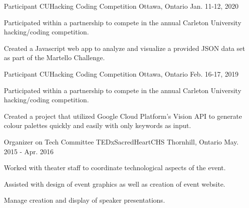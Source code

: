 

\begin{cventries}

  \cventry
    {Participant} %
    {CUHacking Coding Competition} %
    {Ottawa, Ontario} %
    {Jan. 11-12, 2020} %
    {
      \begin{cvitems} %
      \item {Participated within a partnership to compete in the annual Carleton University hacking/coding competition.}
      \item {Created a Javascript web app to analyze and visualize a provided JSON data set as part of the Martello Challenge.}
      \end{cvitems}
    }

  \cventry
    {Participant} %
    {CUHacking Coding Competition} %
    {Ottawa, Ontario} %
    {Feb. 16-17, 2019} %
    {
      \begin{cvitems} %
      \item {Participated within a partnership to compete in the annual Carleton University hacking/coding competition.}
      \item {Created a project that utilized Google Cloud Platform's Vision API to generate colour palettes quickly and easily with only keywords as input.}
      \end{cvitems}
    }

  \cventry
    {Organizer on Tech Committee } %
    {TEDxSacredHeartCHS} %
    {Thornhill, Ontario} %
    {May. 2015 - Apr. 2016} %
    {
      \begin{cvitems} %
        \item {Worked with theater staff to coordinate technological aspects of the event.}
        \item {Assisted with design of event graphics as well as creation of event website.}
        \item {Manage creation and display of speaker presentations.}
      \end{cvitems}
    }

\end{cventries}
